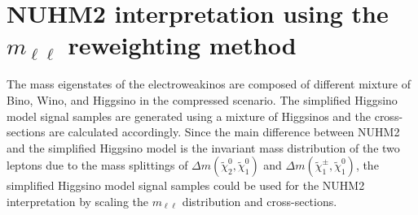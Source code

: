 

\section{NUHM2 interpretation using the $m_{\ell \ell}$ reweighting method}
\label{sec:results_mll_reweighting}
The mass eigenstates of the electroweakinos are composed of different mixture of Bino, Wino, and Higgsino in the compressed scenario.
The simplified Higgsino model signal samples are generated using a mixture of Higgsinos and the cross-sections are calculated accordingly.
Since the main difference between NUHM2 and the simplified Higgsino model is the invariant mass distribution of the two leptons due to the mass splittings of $\Delta m(\widetilde{\chi}^{0}_{2}, \widetilde{\chi}^{0}_{1})$ and $\Delta m(\widetilde{\chi}^{\pm}_{1}, \widetilde{\chi}^{0}_{1})$, the simplified Higgsino model signal samples could be used for the NUHM2 interpretation by scaling the $m_{\ell \ell}$ distribution and cross-sections.

